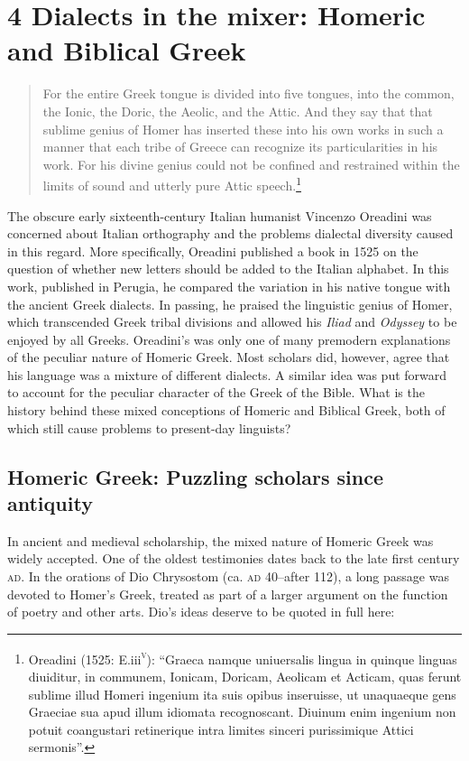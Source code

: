 \section{\textsc{4} Dialects in the mixer: Homeric and Biblical Greek}
\hypertarget{Toc19704826}{}\begin{quote}
For the entire Greek tongue is divided into five tongues, into the common, the Ionic, the Doric, the Aeolic, and the Attic. And they say that that sublime genius of Homer has inserted these into his own works in such a manner that each tribe of Greece can recognize its particularities in his work. For his divine genius could not be confined and restrained within the limits of sound and utterly pure Attic speech.\footnote{Oreadini (1525: E.iii\textsc{\textsuperscript{v}}): “Graeca namque uniuersalis lingua in quinque linguas diuiditur, in communem, Ionicam, Doricam, Aeolicam et Acticam, quas ferunt sublime illud Homeri ingenium ita suis opibus inseruisse, ut unaquaeque gens Graeciae sua apud illum idiomata recognoscant. Diuinum enim ingenium non potuit coangustari retinerique intra limites sinceri purissimique Attici sermonis”.}
\end{quote}

The obscure early sixteenth-century Italian humanist Vincenzo Oreadini was concerned about Italian orthography and the problems dialectal diversity caused in this regard. More specifically, Oreadini published a book in 1525 on the question of whether new letters should be added to the Italian alphabet. In this work, published in Perugia, he compared the variation in his native tongue with the ancient Greek dialects. In passing, he praised the linguistic genius of Homer, which transcended Greek tribal divisions and allowed his \textit{Iliad} and \textit{Odyssey} to be enjoyed by all Greeks. Oreadini’s was only one of many premodern explanations of the peculiar nature of Homeric Greek. Most scholars did, however, agree that his language was a mixture of different dialects. A similar idea was put forward to account for the peculiar character of the Greek of the Bible. What is the history behind these mixed conceptions of Homeric and Biblical Greek, both of which still cause problems to present-day linguists?

\subsection{Homeric Greek: Puzzling scholars since antiquity}
\hypertarget{Toc19704827}{}
In ancient and medieval scholarship, the mixed nature of Homeric Greek was widely accepted. One of the oldest testimonies dates back to the late first century \textsc{ad}. In the orations of Dio Chrysostom (ca. \textsc{ad} 40–after 112), a long passage was devoted to Homer’s Greek, treated as part of a larger argument on the function of poetry and other arts. Dio’s ideas deserve to be quoted in full here:

